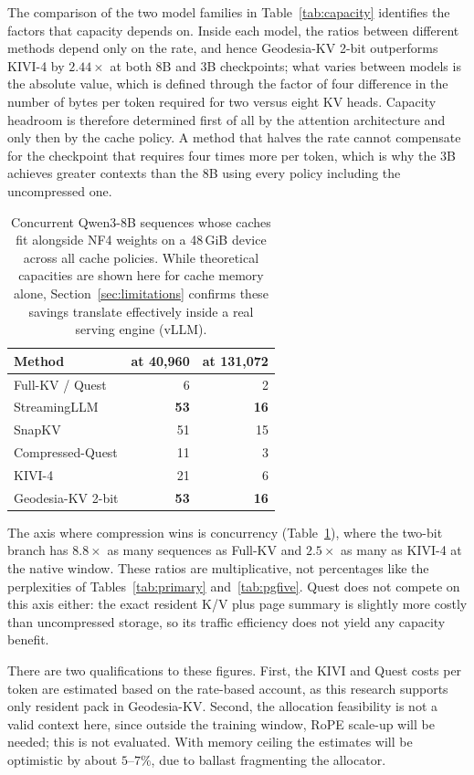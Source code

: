 \documentclass[10pt,twocolumn]{article}
\newcommand{\method}{Geodesia-KV}
\begin{document}
The comparison of the two model families in Table~\ref{tab:capacity}
identifies the factors that capacity depends on. Inside each model, the ratios
between different methods depend only on the rate, and hence \method{} 2-bit
outperforms KIVI-4 by $2.44\times$ at both 8B and 3B checkpoints;
what varies between models is the absolute value, which is defined through
the factor of four difference in the number of bytes per token required for
two versus eight KV heads. Capacity headroom is therefore determined first of
all by the attention architecture and only then by the cache policy. A
method that halves the rate cannot compensate for the checkpoint that
requires four times more per token, which is why the 3B achieves greater
contexts than the 8B using every policy including the uncompressed one.

\begin{table}[t]
\centering\small
\caption{Concurrent Qwen3-8B sequences whose caches fit alongside NF4 weights
on a 48\,GiB device across all cache policies. While theoretical capacities are shown here for cache memory alone, Section~\ref{sec:limitations} confirms these savings translate effectively inside a real serving engine (vLLM).}
\label{tab:concurrency}
\begin{tabular}{lrr}
\toprule
Method & at 40,960 & at 131,072 \\
\midrule
Full-KV / Quest & 6 & 2 \\
StreamingLLM & \textbf{53} & \textbf{16} \\
SnapKV & 51 & 15 \\
Compressed-Quest & 11 & 3 \\
KIVI-4 & 21 & 6 \\
\method{} 2-bit & \textbf{53} & \textbf{16} \\
\bottomrule
\end{tabular}
\end{table}
The axis where compression wins is concurrency
(Table~\ref{tab:concurrency}), where the two-bit branch has $8.8\times$ as many
sequences as Full-KV and $2.5\times$ as many as KIVI-4 at the native window.
These ratios are multiplicative, not percentages like the perplexities of
Tables~\ref{tab:primary} and~\ref{tab:pgfive}. Quest does not compete on this
axis either: the exact resident K/V plus page summary is slightly more costly
than uncompressed storage, so its traffic efficiency does not yield any capacity
benefit.

There are two qualifications to these figures. First, the KIVI and Quest costs
per token are estimated based on the rate-based account, as this research
supports only resident pack in \method{}. Second, the allocation feasibility is
not a valid context here, since outside the training window, RoPE scale-up will
be needed; this is not evaluated. With memory ceiling the estimates will be
optimistic by about $5$--$7\%$, due to ballast fragmenting the allocator.
\end{document}
